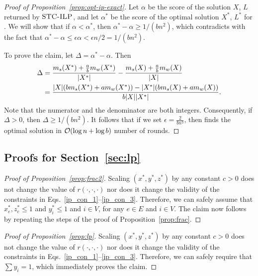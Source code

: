 \begin{proof}[Proof of Proposition~\ref{prop:opt-ip-exact}]
Let $\alpha$ be the score of the solution $X$, $L$ returned by $\textsc{STC-ILP}$, and let $\alpha^*$ be the score of the optimal solution $X^*$, $L^*$ for \prbstrwk.
We will show that if $\alpha < \alpha^*$, then $\alpha^* - \alpha \geq 1/(bn^2)$, which contradicts with the fact that $\alpha^* - \alpha \leq \epsilon \alpha < \epsilon n / 2 = 1/(bn^2)$.

To prove the claim, let $\Delta = \alpha^* - \alpha$. Then
\[
\begin{split}
	\Delta & =
	\frac{m_s(X^*) + \frac{a}{b} m_w(X^*)}{{\left|X^*\right|}} - \frac{m_s(X) + \frac{a}{b} m_w(X)}{{\left|X\right|} } \\
	& = \frac{ {\left|X\right|} (bm_s(X^*) + a m_w(X^*)) -  {\left|X^*\right|}(bm_s(X) + a m_w(X))}{b {\left|X\right|} {\left|X^*\right|}}.
\end{split}
\]
Note that the numerator and the denominator are both integers.
Consequently, if $\Delta > 0$, then $\Delta \geq 1/(bn^2)$.
It follows that if we set $\epsilon = \frac{2}{bn^3}$, then \algip finds the optimal solution in  $\bigO{\log n + \log b}$ number of rounds.
\end{proof}

\subsection{Proofs for Section~\ref{sec:lp}}
\label{appendix:lp}

\begin{proof}[Proof of Proposition~\ref{prop:frac2}]
Scaling $(x^*, y^*, z^*)$ by any constant $c > 0$ does not
change the value of $r(\cdot, \cdot, \cdot)$ nor does it change the validity of the constraints in Eqs.~\ref{ip_con_1}--\ref{ip_con_3}. Therefore, we can safely assume that $x_e^*, z_e^* \leq 1$ and $y_i^* \leq 1$ and $i \in V$, for any $e \in E$ and $i \in V$.
The claim now follows by repeating the steps of the proof of Proposition~\ref{prop:frac}.
\end{proof}


\begin{proof}[Proof of Proposition~\ref{prop:lp}]
Scaling $(x^*, y^*, z^*)$ by any constant $c > 0$ does not
change the value of $r(\cdot, \cdot, \cdot)$ nor does it change the validity of the constraints in Eqs.~\ref{ip_con_1}--\ref{ip_con_3}. Therefore, we can safely require that $\sum y_i = 1$, which immediately proves the claim.
\end{proof}


